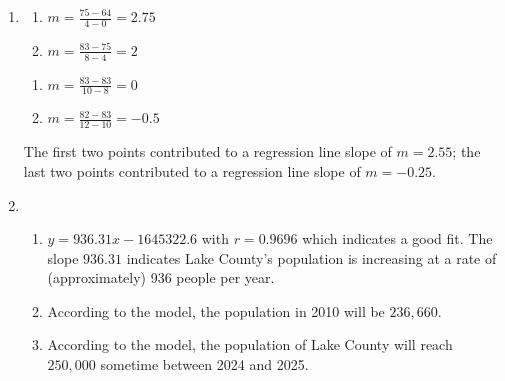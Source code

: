 \documentclass{ximera}
\begin{document}
\begin{enumerate}

\setcounter{enumi}{\value{HW}}

\item

\begin{multicols}{2}

 \begin{enumerate}

\item $m = \frac{75-64}{4-0} = 2.75$

\item $m = \frac{83-75}{8-4} = 2$

\end{enumerate}

\end{multicols}

\begin{multicols}{2}

\begin{enumerate}

\addtocounter{enumii}{2}

\item  $m = \frac{83-83}{10-8} = 0$

\item  $m = \frac{82-83}{12-10} = -0.5$

\end{enumerate}

\end{multicols}

The first two points contributed to a regression line slope of $m = 2.55$;  the last two points contributed to a regression line slope of $m=-0.25$.

\item  \begin{enumerate}


\item  $y = 936.31x - 1645322.6$ with $r=0.9696$ which indicates a good fit.  The slope $936.31$ indicates Lake County's population is increasing at a rate of (approximately) 936 people per year.

\item  According to the model, the population in 2010 will be $236, \!660$.

\item  According to the model, the population of Lake County will reach $250,\!000$ sometime between 2024 and 2025.

\end{enumerate}


\end{enumerate}
\end{document}
